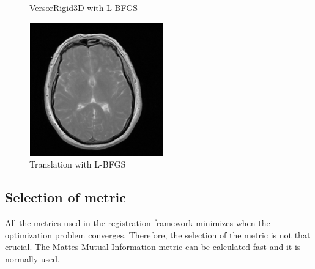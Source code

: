 \documentclass[11pt,english]{article}
\begin{document}
\begin{figure}[h!]
\begin{minipage}[b]{0.3\textwidth}
      \caption{VersorRigid3D with \gls{L-BFGS}}
      \label{fig:versorLBFGS}
    \end{minipage}
    \begin{minipage}[b]{0.3\textwidth}
        \includegraphics[width = \textwidth]{images/TranslationLBFGS.PNG}
        \caption{Translation with \gls{L-BFGS}}
        \label{fig:translationLBFGS}
      \end{minipage}
  \end{figure}
\subsection*{Selection of metric}
All the metrics used in the registration framework minimizes when the optimization problem converges. Therefore, the selection of the metric is not that crucial. The Mattes Mutual Information metric can be calculated fast and it is normally used.
\end{document}

